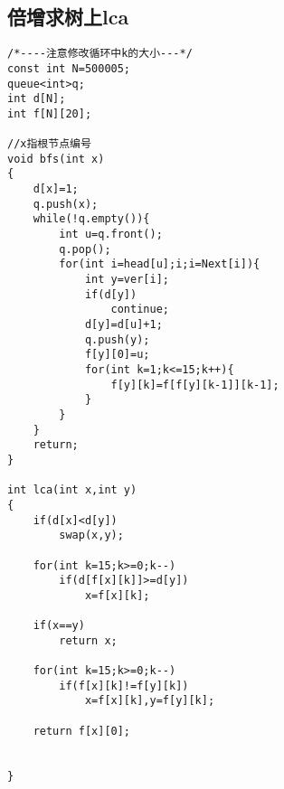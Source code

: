 \documentclass[twocolumn,a4]{article}
\begin{document}
\subsection{倍增求树上lca}
\begin{lstlisting}
/*----注意修改循环中k的大小---*/
const int N=500005;
queue<int>q;
int d[N];
int f[N][20];

//x指根节点编号
void bfs(int x)
{
    d[x]=1;
    q.push(x);
    while(!q.empty()){
        int u=q.front();
        q.pop();
        for(int i=head[u];i;i=Next[i]){
            int y=ver[i];
            if(d[y])
                continue;
            d[y]=d[u]+1;
            q.push(y);
            f[y][0]=u;
            for(int k=1;k<=15;k++){
                f[y][k]=f[f[y][k-1]][k-1];
            }
        }
    }
    return;
}

int lca(int x,int y)
{
    if(d[x]<d[y])
        swap(x,y);
    
    for(int k=15;k>=0;k--)
        if(d[f[x][k]]>=d[y])
            x=f[x][k];
            
    if(x==y)
        return x;
    
    for(int k=15;k>=0;k--)
        if(f[x][k]!=f[y][k])
            x=f[x][k],y=f[y][k];
            
    return f[x][0];
    
    
}
\end{lstlisting}
\end{document}
